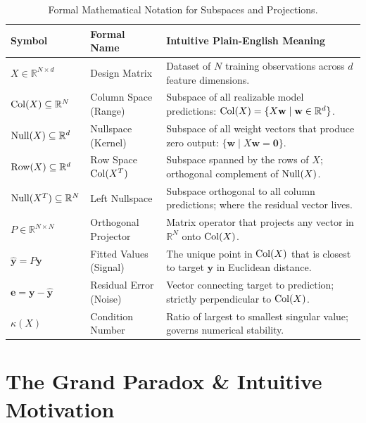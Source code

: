 \begin{table}[htbp]
\centering
\small
\begin{tabularx}{\textwidth}{llX}
\toprule
\textbf{Symbol} & \textbf{Formal Name} & \textbf{Intuitive Plain-English Meaning} \\
\midrule
$X \in \mathbb{R}^{N \times d}$ & Design Matrix & Dataset of $N$ training observations across $d$ feature dimensions. \\
$\operatorname{Col}(X) \subseteq \mathbb{R}^N$ & Column Space (Range) & Subspace of all realizable model predictions: $\operatorname{Col}(X) = \{X\mathbf{w} \mid \mathbf{w} \in \mathbb{R}^d\}$. \\
$\operatorname{Null}(X) \subseteq \mathbb{R}^d$ & Nullspace (Kernel) & Subspace of all weight vectors that produce zero output: $\{\mathbf{w} \mid X\mathbf{w} = \mathbf{0}\}$. \\
$\operatorname{Row}(X) \subseteq \mathbb{R}^d$ & Row Space $\operatorname{Col}(X^T)$ & Subspace spanned by the rows of $X$; orthogonal complement of $\operatorname{Null}(X)$. \\
$\operatorname{Null}(X^T) \subseteq \mathbb{R}^N$ & Left Nullspace & Subspace orthogonal to all column predictions; where the residual vector lives. \\
$P \in \mathbb{R}^{N \times N}$ & Orthogonal Projector & Matrix operator that projects any vector in $\mathbb{R}^N$ onto $\operatorname{Col}(X)$. \\
$\hat{\mathbf{y}} = P\mathbf{y}$ & Fitted Values (Signal) & The unique point in $\operatorname{Col}(X)$ that is closest to target $\mathbf{y}$ in Euclidean distance. \\
$\mathbf{e} = \mathbf{y} - \hat{\mathbf{y}}$ & Residual Error (Noise) & Vector connecting target to prediction; strictly perpendicular to $\operatorname{Col}(X)$. \\
$\kappa(X)$ & Condition Number & Ratio of largest to smallest singular value; governs numerical stability. \\
\bottomrule
\end{tabularx}
\caption{Formal Mathematical Notation for Subspaces and Projections.}
\label{tab:w03_notation}
\end{table}

\section{The Grand Paradox \& Intuitive Motivation}

